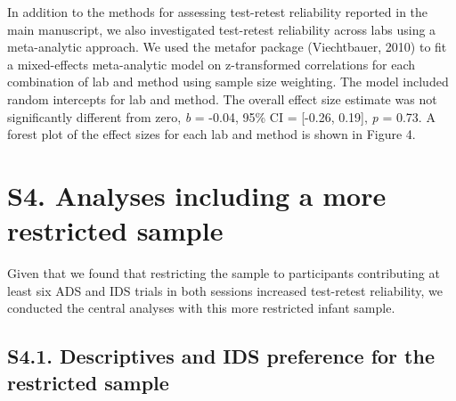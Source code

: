 \documentclass[
  man, donotrepeattitle,floatsintext]{apa6}
\begin{document}
In addition to the methods for assessing test-retest reliability reported in the main manuscript, we also investigated test-retest reliability across labs using a meta-analytic approach.
We used the metafor package (Viechtbauer, 2010) to fit a mixed-effects meta-analytic model on z-transformed correlations for each combination of lab and method using sample size weighting.
The model included random intercepts for lab and method.
The overall effect size estimate was not significantly different from zero, \emph{b} = -0.04, 95\% CI = {[}-0.26, 0.19{]}, \emph{p} = 0.73.
A forest plot of the effect sizes for each lab and method is shown in Figure 4.

\hypertarget{s4.-analyses-including-a-more-restricted-sample}{%
\section{S4. Analyses including a more restricted sample}\label{s4.-analyses-including-a-more-restricted-sample}}

Given that we found that restricting the sample to participants contributing at least six ADS and IDS trials in both sessions increased test-retest reliability, we conducted the central analyses with this more restricted infant sample.

\hypertarget{s4.1.-descriptives-and-ids-preference-for-the-restricted-sample}{%
\subsection{S4.1. Descriptives and IDS preference for the restricted sample}\label{s4.1.-descriptives-and-ids-preference-for-the-restricted-sample}}
\end{document}
